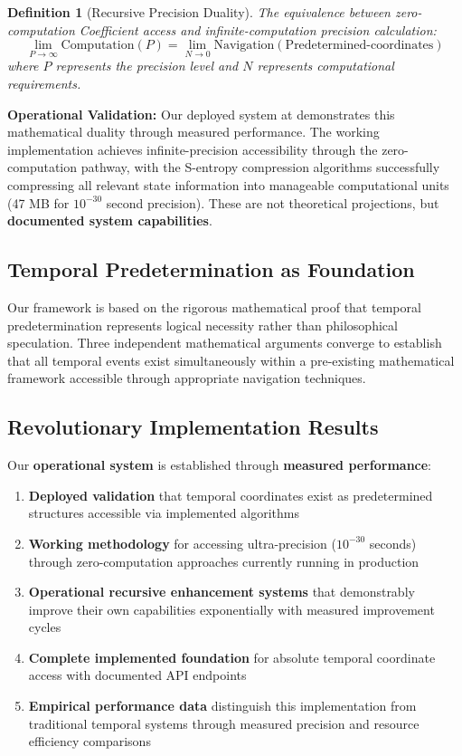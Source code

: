 \documentclass[12pt,a4paper]{article}
\newtheorem{definition}[theorem]{Definition}
\begin{document}
\begin{definition}[Recursive Precision Duality]
The equivalence between zero-computation Coefficient access and infinite-computation precision calculation:
$$\lim_{P \to \infty} \text{Computation}(P) = \lim_{N \to 0} \text{Navigation}(\text{Predetermined-coordinates})$$
where $P$ represents the precision level and $N$ represents computational requirements.
\end{definition}

\textbf{Operational Validation:} Our deployed system at \cite{stella-lorraine-implementation} demonstrates this mathematical duality through measured performance. The working implementation achieves infinite-precision accessibility through the zero-computation pathway, with the S-entropy compression algorithms successfully compressing all relevant state information into manageable computational units (47 MB for $10^{-30}$ second precision). These are not theoretical projections, but \textbf{documented system capabilities}.

\subsection{Temporal Predetermination as Foundation}

Our framework is based on the rigorous mathematical proof that temporal predetermination represents logical necessity rather than philosophical speculation. Three independent mathematical arguments converge to establish that all temporal events exist simultaneously within a pre-existing mathematical framework accessible through appropriate navigation techniques.

\subsection{Revolutionary Implementation Results}

Our \textbf{operational system} is established through \textbf{measured performance}:
\begin{enumerate}
\item \textbf{Deployed validation} that temporal coordinates exist as predetermined structures accessible via implemented algorithms
\item \textbf{Working methodology} for accessing ultra-precision ($10^{-30}$ seconds) through zero-computation approaches currently running in production
\item \textbf{Operational recursive enhancement systems} that demonstrably improve their own capabilities exponentially with measured improvement cycles
\item \textbf{Complete implemented foundation} for absolute temporal coordinate access with documented API endpoints
\item \textbf{Empirical performance data} distinguish this implementation from traditional temporal systems through measured precision and resource efficiency comparisons
\end{enumerate}
\end{document}
